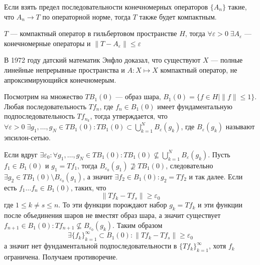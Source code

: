 \documentclass[12pt]{article}
\begin{document}
Если взять предел последовательности конечномерных операторов $\{A_n\}$ такие,
что $A_n \to T$ по операторной норме, тогда $T$ также будет компактным.
\begin{Utv}
    $T$ --- компактный оператор в гильбертовом пространстве $H$, тогда 
    $\forall \varepsilon > 0\; \exists A_\varepsilon$ --- конечномерные
    операторы
    и $\|T - A_\varepsilon\| \le \varepsilon$
\end{Utv}

В 1972 году датский математик Энфло доказал, что существуют $X$ --- полные
линейные непрерывные пространства и $A : X \mapsto X$ компактный оператор, не
апроксимирующийся конечномерым.
\begin{Proof}
    Посмотрим на множество $TB_1(0)$ --- образ шара, $B_1(0) = \{f \in H \mid
    \|f\| \le 1\}$.
    Любая последовательность $Tf_n$, где $f_n \in B_1(0)$ имеет фундаментальную 
    подпоследовательность $T f_{n_k}$, тогда утверждается, что $\forall 
    \varepsilon > 0\; \exists g_1,\dots,g_N \in TB_1(0)\colon TB_1(0) \subset
    \bigcup\limits_{k = 1}^N B_\varepsilon(g_k)$, где $B_\varepsilon(g_k)$ 
    называют эпсилон-сетью.
    
    Если вдруг $\exists \varepsilon_0\colon \forall g_1,\dots,g_N \in TB_1(0)
    \colon TB_1(0) \nsubseteq \bigcup\limits_{k = 1}^N B_\varepsilon(g_k)$.
    Пусть $f_1 \in B_1(0)$ и $g_1 = T f_1$, тогда $B_{\varepsilon_0}(g_1)
    \nsupseteq TB_1(0)$, следовательно $\exists g_2 \in TB_1(0)\setminus 
    B_{\varepsilon_0}(g_1)$, а значит $\exists f_2 \in B_1(0) \colon g_2 =
    Tf_2$ и так далее.
    Если есть $f_1 \dots f_n \in B_1(0)$, таких, что
    $$
    \|T f_k - T f_s\| \ge \varepsilon_0
    $$
    где $1 \le k \ne s \le n$.
    То эти функции порождают набор $g_k = T f_k$ и эти функции после 
    объединения шаров не вместят образ шара, а значит существует $f_{n + 1}
    \in B_1(0)\colon Tf_{n + 1} \nsubseteq B_{\varepsilon_0}(g_k)$.
    Таким образом
    $$
    \exists\{f_k\}_{k = 1}^\infty \subset B_1(0) \colon \|T f_k - T f_s\| \ge
    \varepsilon_0
    $$
    а значит нет фундаментальной подпоследовательности в $\{T f_k\}_{k = 1}^
    \infty$, хотя $f_k$ ограничена.
    Получаем противоречие.
    

\end{Proof}
\end{document}
